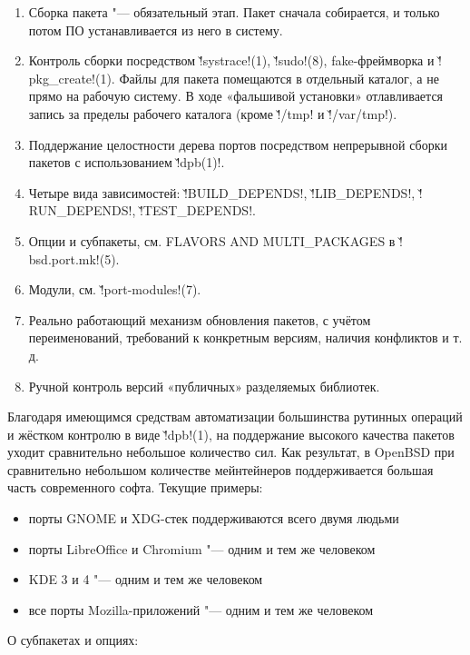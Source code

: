 \documentclass[10pt, a5paper]{article}
\begin{document}
\begin{enumerate}
  \item Сборка пакета "--- обязательный этап. Пакет сначала собирается, и только потом ПО устанавливается из него в систему.
  \item Контроль сборки посредством \v!systrace!(1), \v!sudo!(8), fake-\linebreak{}фреймворка и \v!pkg\_create!(1). Файлы для пакета помещаются в отдельный каталог, а не прямо на рабочую систему. В ходе «фальшивой установки» отлавливается запись за пределы рабочего каталога (кроме \v!/tmp! и \v!/var/tmp!).
  \item Поддержание целостности дерева портов посредством непрерывной сборки пакетов с использованием \v!dpb(1)!.
  \item Четыре вида зависимостей: \v!BUILD\_DEPENDS!, \v!LIB\_DE\-PENDS!, \linebreak \v!RUN\_DEPENDS!, \v!TEST\_DEPENDS!.
  \item Опции и субпакеты, см. FLAVORS AND MULTI\_PACKAGES в \v!bsd.port.mk!(5).
  \item Модули, см. \v!port-modules!(7).
  \item Реально работающий механизм обновления пакетов, с учётом переименований, требований к конкретным версиям, наличия конфликтов и т.\,д.
  \item Ручной контроль версий «публичных» разделяемых библиотек.
\end{enumerate}

Благодаря имеющимся средствам автоматизации большинства рутинных операций и жёстком контролю в виде \v!dpb!(1), на поддержание высокого качества пакетов уходит сравнительно небольшое количество сил. Как результат, в OpenBSD при сравнительно небольшом количестве мейнтейнеров поддерживается большая часть современного софта. Текущие примеры:

\begin{itemize}
  \item порты GNOME и XDG-стек поддерживаются всего двумя \linebreak людьми
  \item порты LibreOffice и Chromium "--- одним и тем же человеком
  \item KDE 3 и 4 "--- одним и тем же человеком
  \item все порты Mozilla-приложений "--- одним и тем же человеком
\end{itemize}

О субпакетах и опциях:
\end{document}
